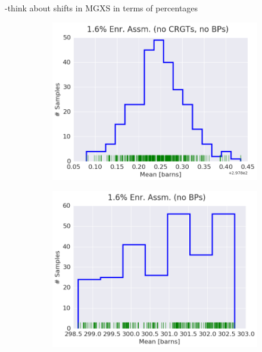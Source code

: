 -think about shifts in \ac{MGXS} in terms of percentages

\begin{figure}[h!]
\centering
\begin{subfigure}{0.5\textwidth}
  \centering
  \includegraphics[width=\linewidth]{figures/patterns/assm-1.6-inf/hist-kde-rug/assm-16-inf-fiss-2}
  \caption{}
  \label{fig:chap9-hist-assm-1.6-inf-fiss}
\end{subfigure}%
\begin{subfigure}{0.5\textwidth}
  \centering
  \includegraphics[width=\linewidth]{figures/patterns/assm-1.6/hist-kde-rug/assm-16-fiss-2}
  \caption{}
  \label{fig:chap9-hist-assm-1.6-fiss}
\end{subfigure}

\end{figure}
